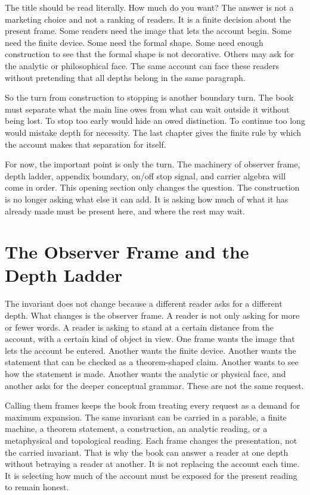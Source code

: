 The title should be read literally. How much do you want? The answer is not a
marketing choice and not a ranking of readers. It is a finite decision about the
present frame. Some readers need the image that lets the account begin. Some
need the finite device. Some need the formal shape. Some need enough
construction to see that the formal shape is not decorative. Others may ask for
the analytic or philosophical face. The same account can face these readers
without pretending that all depths belong in the same paragraph.

So the turn from construction to stopping is another boundary turn. The book must
separate what the main line owes from what can wait outside it without being
lost. To stop too early would hide an owed distinction. To continue too long
would mistake depth for necessity. The last chapter gives the finite rule by
which the account makes that separation for itself.

For now, the important point is only the turn. The machinery of observer frame,
depth ladder, appendix boundary, on/off stop signal, and carrier algebra will
come in order. This opening section only changes the question. The construction
is no longer asking what else it can add. It is asking how much of what it has
already made must be present here, and where the rest may wait.

\section{The Observer Frame and the Depth Ladder}

The invariant does not change because a different reader asks for a different
depth. What changes is the observer frame. A reader is not only asking for more
or fewer words. A reader is asking to stand at a certain distance from the
account, with a certain kind of object in view. One frame wants the image that
lets the account be entered. Another wants the finite device. Another wants the
statement that can be checked as a theorem-shaped claim. Another wants to see
how the statement is made. Another wants the analytic or physical face, and
another asks for the deeper conceptual grammar. These are not the same request.

Calling them frames keeps the book from treating every request as a demand for
maximum expansion. The same invariant can be carried in a parable, a finite
machine, a theorem statement, a construction, an analytic reading, or a
metaphysical and topological reading. Each frame changes the presentation, not
the carried invariant. That is why the book can answer a reader at one depth
without betraying a reader at another. It is not replacing the account each
time. It is selecting how much of the account must be exposed for the present
reading to remain honest.

